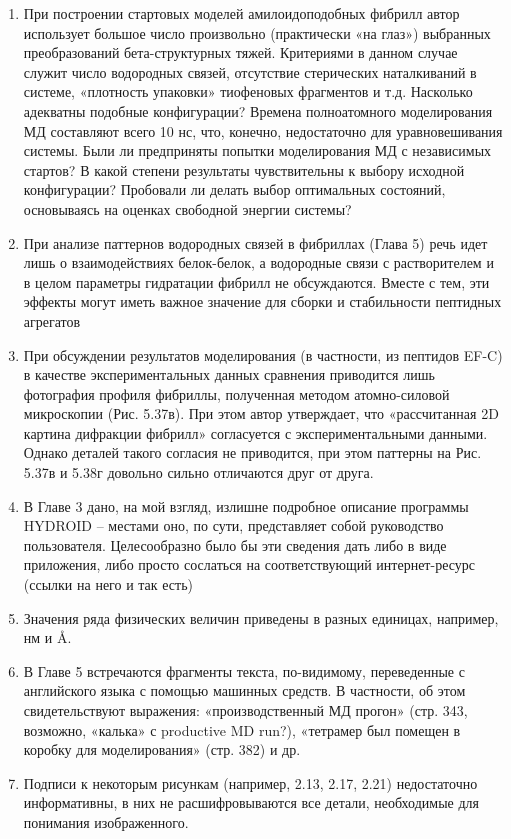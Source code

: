 \begin{frame}[allowframebreaks]
\begin{enumerate}
        \item    При построении стартовых моделей амилоидоподобных фибрилл автор использует большое число произвольно (практически «на глаз») выбранных преобразований бета-структурных тяжей. Критериями в данном случае служит число водородных связей, отсутствие стерических наталкиваний в системе, «плотность упаковки» тиофеновых фрагментов и т.д. Насколько адекватны подобные конфигурации? Времена полноатомного моделирования МД составляют всего 10 нс, что, конечно, недостаточно для уравновешивания системы. Были ли предприняты попытки моделирования МД с независимых стартов? В какой степени результаты чувствительны к выбору исходной конфигурации? Пробовали ли делать выбор оптимальных состояний, основываясь на оценках свободной энергии системы? 
        \item     При анализе паттернов водородных связей в фибриллах (Глава 5) речь идет лишь о взаимодействиях белок-белок, а водородные связи с растворителем и в целом параметры гидратации фибрилл не обсуждаются. Вместе с тем, эти эффекты могут иметь важное значение для сборки и стабильности пептидных агрегатов 
        \item   При обсуждении результатов моделирования (в частности, из пептидов EF-C) в качестве экспериментальных данных сравнения приводится лишь фотография профиля фибриллы, полученная методом атомно-силовой микроскопии (Рис. 5.37в). При этом автор утверждает, что «рассчитанная 2D картина дифракции фибрилл» согласуется с экспериментальными данными. Однако деталей такого согласия не приводится, при этом паттерны на Рис. 5.37в и 5.38г довольно сильно отличаются друг от друга.  
        \item    В Главе 3 дано, на мой взгляд, излишне подробное описание программы HYDROID – местами оно, по сути, представляет собой руководство пользователя. Целесообразно было бы эти сведения дать либо в виде приложения, либо просто сослаться на соответствующий интернет-ресурс (ссылки на него и так есть) 
        \item   Значения ряда физических величин приведены в разных единицах, например, нм и Å.
        \item  В Главе 5 встречаются фрагменты текста, по-видимому, переведенные с английского языка с  помощью машинных средств. В частности, об этом свидетельствуют выражения: «производственный МД прогон» (стр. 343, возможно, «калька» с productive MD run?), «тетрамер был помещен в коробку для моделирования» (стр. 382) и др. 
        \item  Подписи к некоторым рисункам (например, 2.13, 2.17, 2.21) недостаточно информативны, в них не расшифровываются все детали, необходимые для понимания изображенного.


\end{enumerate}
\end{frame}
